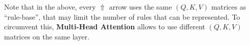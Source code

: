 \documentclass[runningheads]{llncs}
\begin{document}
Note that in the above, every $\Uparrow$ arrow uses the same $(Q,K,V)$ matrices as ``rule-base'', that may limit the number of rules that can be represented.  To circumvent this, \textbf{Multi-Head Attention} allows to use different $(Q,K,V)$ matrices on the same layer.

%
%


%
%
%
% 
% 
%
\printbibliography
\end{document}
